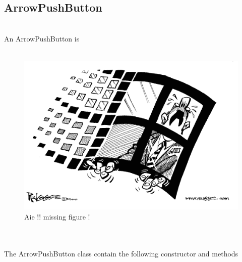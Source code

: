 \documentclass[a4paper,11pt]{extarticle}
\begin{document}
\newpage
\subsection{ArrowPushButton}

~\\ An ArrowPushButton is 
~\\
~\\

\begin{figure}[htbp]
   \centering
   \includegraphics[scale=0.55]{AWFig.png} 
   \caption{Aie !! missing figure !}
   \label{fig:16 }
\end{figure}

~\\

~\\ The ArrowPushButton class contain the following constructor and methods
\end{document}
